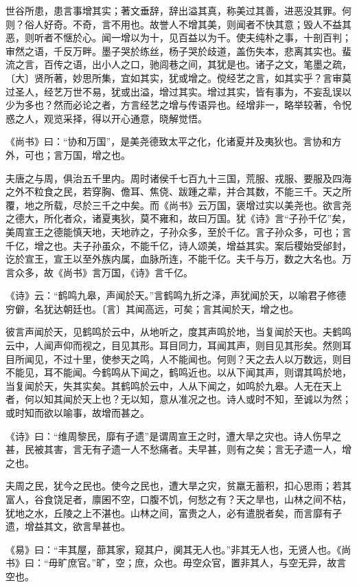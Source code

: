 \documentclass[]{article}
\begin{document}
世谷所患，患言事增其实；著文垂辞，辞出溢其真，称美过其善，进恶没其罪。何则？俗人好奇。不奇，言不用也。故誉人不增其美，则闻者不快其意；毁人不益其恶，则听者不惬於心。闻一增以为十，见百益以为千。使夫纯朴之事，十剖百判；审然之语，千反万畔。墨子哭於练丝，杨子哭於歧道，盖伤失本，悲离其实也。蜚流之言，百传之语，出小人之口，驰闾巷之间，其犹是也。诸子之文，笔墨之疏，〔大〕贤所著，妙思所集，宜如其实，犹或增之。傥经艺之言，如其实乎？言审莫过圣人，经艺万世不易，犹或出溢，增过其实。增过其实，皆有事为，不妄乱误以少为多也？然而必论之者，方言经艺之增与传语异也。经增非一，略举较著，令怳惑之人，观览采择，得以开心通意，晓解觉悟。

《尚书》曰：``协和万国''，是美尧德致太平之化，化诸夏并及夷狄也。言协和方外，可也；言万国，增之也。

夫唐之与周，俱治五千里内。周时诸侯千七百九十三国，荒服、戎服、要服及四海之外不粒食之民，若穿胸、儋耳、焦侥、跋踵之辈，并合其数，不能三千。天之所覆，地之所载，尽於三千之中矣。而《尚书》云万国，褒增过实以美尧也。欲言尧之德大，所化者众，诸夏夷狄，莫不雍和，故曰万国。犹《诗》言``子孙千亿''矣，美周宣王之德能慎天地，天地祚之，子孙众多，至於千亿。言子孙众多，可也；言千亿，增之也。夫子孙虽众，不能千亿，诗人颂美，增益其实。案后稷始受邰封，讫於宣王，宣王以至外族内属，血脉所连，不能千亿。夫千与万，数之大名也。万言众多，故《尚书》言万国，《诗》言千亿。

《诗》云：``鹤鸣九皋，声闻於天。''言鹤鸣九折之泽，声犹闻於天，以喻君子修德穷僻，名犹达朝廷也。〔言〕其闻高远，可矣；言其闻於天，增之也。

彼言声闻於天，见鹤鸣於云中，从地听之，度其声鸣於地，当复闻於天也。夫鹤鸣云中，人闻声仰而视之，目见其形。耳目同力，耳闻其声，则目见其形矣。然则耳目所闻见，不过十里，使参天之鸣，人不能闻也。何则？天之去人以万数远，则目不能见，耳不能闻。今鹤鸣从下闻之，鹤鸣近也。以从下闻其声，则谓其鸣於地，当复闻於天，失其实矣。其鹤鸣於云中，人从下闻之，如鸣於九皋。人无在天上者，何以知其闻於天上也？无以知，意从准况之也。诗人或时不知，至诚以为然；或时知而欲以喻事，故增而甚之。

《诗》曰：``维周黎民，靡有孑遗''是谓周宣王之时，遭大旱之灾也。诗人伤早之甚，民被其害，言无有孑遗一人不愁痛者。夫早甚，则有之矣；言无孑遗一人，增之也。

夫周之民，犹今之民也。使今之民也，遭大旱之灾，贫羸无蓄积，扣心思雨；若其富人，谷食饶足者，廪囷不空，口腹不饥，何愁之有？天之旱也，山林之间不枯，犹地之水，丘陵之上不湛也。山林之间，富贵之人，必有遣脱者矣，而言靡有孑遗，增益其文，欲言旱甚也。

《易》曰：``丰其屋，蔀其家，窥其户，阒其无人也。''非其无人也，无贤人也。《尚书》曰：``毋旷庶官。''旷，空；庶，众也。毋空众官，置非其人，与空无异，故言空也。
\end{document}
